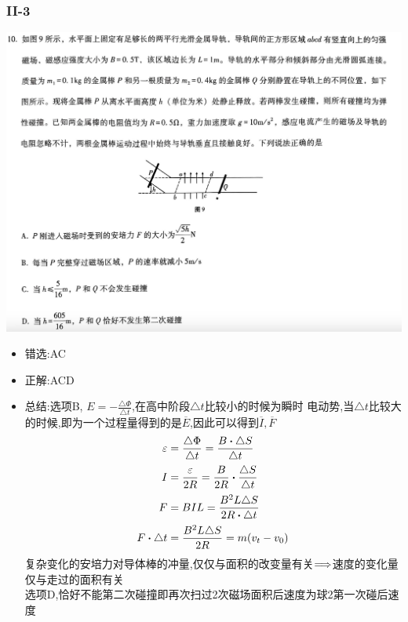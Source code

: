 \documentclass{article}
\begin{document}
        \subsubsection{II-3}
        \includegraphics[width=50em,keepaspectratio]{./pictures/1.3-3.png}
    
        \begin{itemize}
            \item 错选:\quad AC
            \item 正解:\quad ACD
            \item 总结:\quad 选项B, $E = - \frac{\triangle \Phi}{\triangle t}$,在高中阶段$\triangle t$比较小的时候为瞬时
            电动势,当$\triangle t$比较大的时候,即为一个过程量得到的是$\overline{E}$,因此可以得到$\overline{I},\overline{F}$
            \begin{align*}
                \varepsilon &= \frac{\triangle \Phi}{\triangle t} = \frac{B \vdot \triangle S}{\triangle t}   \\
                I &= \frac{\varepsilon}{2R} = \frac{B}{2R} \vdot \frac{\triangle S}{\triangle t} \\
                F &= B I L = \frac{B^{2}L \triangle S}{2R \vdot \triangle t}    \\
                F \vdot \triangle t &= \frac{B^{2} L \triangle S}{2 R} = m(v_{t} - v_{0})
            \end{align*}
            复杂变化的安培力对导体棒的冲量,仅仅与面积的改变量有关$\Longrightarrow$速度的变化量仅与走过的面积有关 \\
            选项D,恰好不能第二次碰撞即再次扫过2次磁场面积后速度为球2第一次碰后速度
        \end{itemize}
        
\end{document}
